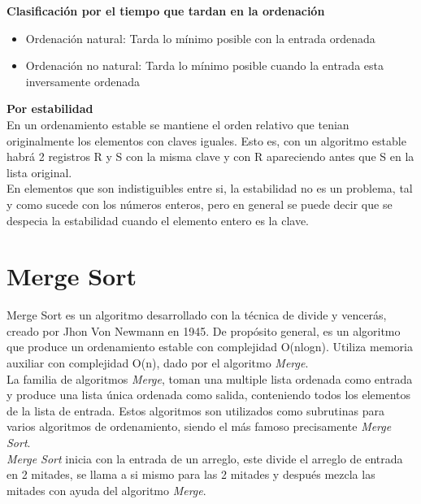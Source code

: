     \textbf{Clasificación por el tiempo que tardan en la ordenación}\\
    \begin{itemize}
        \item Ordenación natural: Tarda lo mínimo posible con la entrada ordenada
        \item Ordenación no natural: Tarda lo mínimo posible cuando la entrada esta inversamente ordenada 
    \end{itemize}
    
    \textbf{Por estabilidad}\\
    En un ordenamiento estable se mantiene el orden relativo que tenian originalmente los elementos con claves iguales. Esto es, con un algoritmo estable habrá 2 registros R y S con la misma clave y con R apareciendo antes que S en la lista original.\\
    
    En elementos que son indistiguibles entre si, la estabilidad no es un problema, tal y como sucede con los números enteros, pero en general se puede decir que se despecia la estabilidad cuando el elemento entero es la clave.\\
    
\section*{Merge Sort}
    Merge Sort es un algoritmo desarrollado con la técnica de divide y vencerás, creado por Jhon Von Newmann en 1945. De propósito general, es un algoritmo que produce un ordenamiento estable con complejidad O(nlogn). Utiliza memoria auxiliar con complejidad O(n), dado por el algoritmo \textit{Merge}.\\
    
    La familia de algoritmos \textit{Merge}, toman una multiple lista ordenada como entrada y produce una lista única ordenada como salida, conteniendo todos los elementos de la lista de entrada. Estos algoritmos son utilizados como subrutinas para varios algoritmos de ordenamiento, siendo el más famoso precisamente \textit{Merge Sort}.\\
    
    \textit{Merge Sort} inicia con la entrada de un arreglo, este divide el arreglo de entrada en 2 mitades, se llama a si mismo para las 2 mitades y después mezcla las mitades con ayuda del algoritmo \textit{Merge}.\\
    
